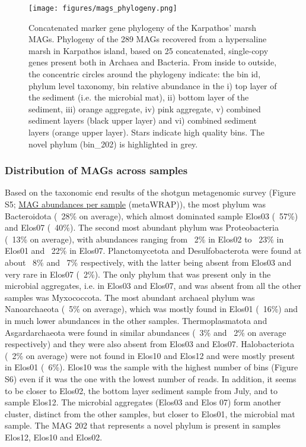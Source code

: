    \begin{figure}[h]
      \centering
      \texttt{[image: figures/mags\_phylogeny.png]}
      \caption[Concatenated marker gene phylogeny of the Karpathos’ marsh MAGs]{
         Concatenated marker gene phylogeny of the Karpathos’ marsh MAGs. 
         Phylogeny of the 289 MAGs recovered from a hypersaline marsh in Karpathos island, based on 25 concatenated, single-copy genes present both in Archaea and Bacteria. 
         From inside to outside, the concentric circles around the phylogeny indicate: the bin id, phylum level taxonomy, bin relative abundance in the 
         i) top layer of the sediment (i.e. the microbial mat), 
         ii) bottom layer of the sediment, 
         iii) orange aggregate, 
         iv) pink aggregate, 
         v) combined sediment layers (black upper layer) and 
         vi) combined sediment layers (orange upper layer). 
         Stars indicate high quality bins. 
         The novel phylum (bin\_202) is highlighted in grey. 
      }
      \label{fig:mags-phylogeny}
   \end{figure}   


\subsubsection*{Distribution of MAGs across samples}

   Based on the taxonomic end results of the shotgun metagenomic survey (Figure S5; \href{https://github.com/hariszaf/karpathos-swamp/blob/main/metaWRAP/QUANT_BINS/bin_abundance_table.tab}{MAG abundances per sample} (metaWRAP)), 
   the most phylum was Bacteroidota (~28\% on average), 
   which almost dominated sample Elos03 (~57\%) and Elos07 (~40\%). 
   The second most abundant phylum was Proteobacteria (~13\% on average), with abundances ranging from ~2\% in Elos02 to ~23\% in Elos01 and ~22\% in Elos07. 
   Planctomycetota and Desulfobacterota were found at about ~8\% and ~7\% respectively, with the latter being absent from Elos03 and very rare in Elos07 (~2\%). 
   The only phylum that was present only in the microbial aggregates, i.e. in Elos03 and Elos07, and was absent from all the other samples was Myxococcota.
   The most abundant archaeal phylum was Nanoarchaeota (~5\% on average), which was mostly found in Elos01 (~16\%) and in much lower abundances in the other samples. 
   Thermoplasmatota and Asgardarchaeota were found in similar abundances (~3\% and ~2\% on average respectively) and they were also absent from Elos03 and Elos07. 
   Halobacteriota (~2\% on average) were not found in Elos10 and Elos12 and were mostly present in Elos01 (~6\%). 
   Elos10 was the sample with the highest number of bins (Figure S6) even if it was the one with the lowest number of reads. 
   In addition, it seems to be closer to Elos02, the bottom layer sediment sample from July, and to sample Elos12. 
   The microbial aggregates (Elos03 and Elos 07) form another cluster, distinct from the other samples, but closer to Elos01, the microbial mat sample.  
   The MAG 202 that represents a novel phylum is present in samples Elos12, Elos10 and Elos02.


